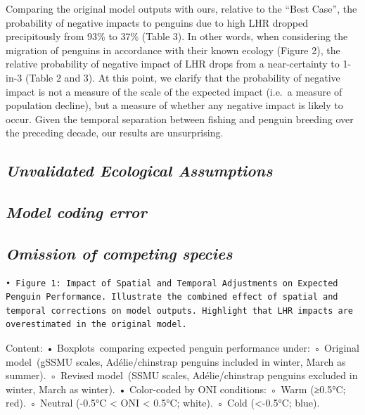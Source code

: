 \documentclass[]{elsarticle} %
\begin{document}
Comparing the original model outputs with ours, relative to the ``Best
Case'', the probability of negative impacts to penguins due to high LHR
dropped precipitously from 93\% to 37\% (Table 3). In other words, when
considering the migration of penguins in accordance with their known
ecology (Figure 2), the relative probability of negative impact of LHR
drops from a near-certainty to 1-in-3 (Table 2 and 3). At this point, we
clarify that the probability of negative impact is not a measure of the
scale of the expected impact (i.e.~a measure of population decline), but
a measure of whether any negative impact is likely to occur. Given the
temporal separation between fishing and penguin breeding over the
preceding decade, our results are unsurprising.

\subsection{\texorpdfstring{\emph{Unvalidated Ecological
Assumptions}}{Unvalidated Ecological Assumptions}}\label{unvalidated-ecological-assumptions-1}

\subsection{\texorpdfstring{\emph{Model coding
error}}{Model coding error}}\label{model-coding-error-1}

\subsection{\texorpdfstring{\emph{Omission of competing
species}}{Omission of competing species}}\label{omission-of-competing-species-2}

\begin{verbatim}
• Figure 1: Impact of Spatial and Temporal Adjustments on Expected Penguin Performance. Illustrate the combined effect of spatial and temporal corrections on model outputs. Highlight that LHR impacts are overestimated in the original model.
\end{verbatim}

Content: • Boxplots~comparing expected penguin performance under: ◦
Original model~(gSSMU scales, Adélie/chinstrap penguins included in
winter, March as summer). ◦ Revised model~(SSMU scales, Adélie/chinstrap
penguins excluded in winter, March as winter). • Color-coded by ONI
conditions: ◦ Warm (≥0.5°C; red). ◦ Neutral (-0.5°C \textless{} ONI
\textless{} 0.5°C; white). ◦ Cold (\textless-0.5°C; blue).
\end{document}
